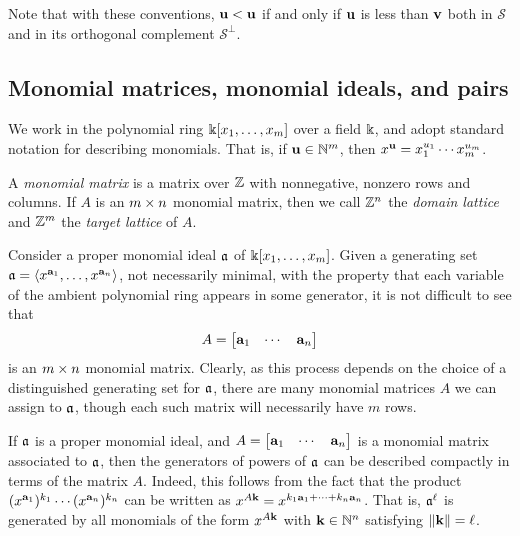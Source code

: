 \documentclass[11pt]{amsart}
\begin{document}
Note that with these conventions, $\mathbf{u} < \mathbf{u}$ if and only if $\mathbf{u}$ is less than $\mathbf{v}$ both in $\mathcal{S}$ and in its orthogonal complement $\mathcal{S}^\perp$.

\subsection{Monomial matrices, monomial ideals, and pairs}
\label{monomial newton preliminaries: ss}

We work in the polynomial ring $\Bbbk[x_1, \ldots, x_m]$ over a field $\Bbbk$, and adopt standard notation for describing monomials.  That is, if $\mathbf{u} \in \mathbb{N}^m$, then $x^{\mathbf{u}} = x_1^{u_1} \cdots x_m^{u_m}$.

\begin{definition}
\label{monomial matrix: D}
A \emph{monomial matrix} is a matrix over $\mathbb{Z}$ with nonnegative, nonzero rows and columns.
If $A$ is an $m \times n$ monomial matrix, then we call $\mathbb{Z}^n$ the \emph{domain lattice} and $\mathbb{Z}^m$ the \emph{target lattice} of $A$. 
\end{definition}

\begin{remark}
\label{monomial matrix ideal: R}  Consider a proper monomial ideal $\mathfrak{a}$ of $\Bbbk[x_1, \ldots, x_{m}]$.  Given a generating set $\mathfrak{a} = \langle x^{\mathbf{a}_1}, \ldots, x^{\mathbf{a}_n} \rangle$, not necessarily minimal, with the property that each variable of the ambient polynomial ring appears in some generator, it is not difficult to see that \[A= \begin{bmatrix} \mathbf{a}_1 & \cdots & \mathbf{a}_n \end{bmatrix}\] is an  $m \times n$ monomial matrix.  Clearly, as this process depends on the choice of a distinguished generating set for $\mathfrak{a}$, there are many monomial matrices $A$ we can assign to $\mathfrak{a}$, though each such matrix will necessarily have $m$ rows.
\end{remark}

\begin{remark}
   \label{generators-via-exponent-matrix: R}  If $\mathfrak{a}$ is a proper monomial ideal, and $A= \begin{bmatrix} \mathbf{a}_1 & \cdots & \mathbf{a}_n \end{bmatrix}$ is a monomial matrix associated to $\mathfrak{a}$, then the generators of powers of $\mathfrak{a}$ can be described compactly in terms of the matrix $A$.
   Indeed, this follows from the fact that the product $(x^{\mathbf{a}_1})^{k_1} \cdots (x^{\mathbf{a}_n})^{k_n}$ can be written as $x^{A \mathbf{k}} = x^{k_1 \mathbf{a}_1 + \cdots + k_n \mathbf{a}_n}$.
   That is, $\mathfrak{a}^\ell$ is generated by all monomials of the form $x^{A \mathbf{k}}$ with $\mathbf{k} \in \mathbb{N}^n$ satisfying $\| \mathbf{k} \| = \ell$.
%
\end{remark}
\end{document}
